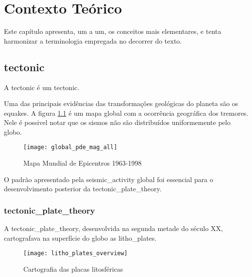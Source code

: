 \chapter{Contexto Teórico}
\label{cap:conceitos}

Este capítulo apresenta, um a um, os conceitos mais elementares, 
e tenta harmonizar a terminologia empregada no decorrer do texto.


\section{\Gls{tectonic}}
\label{sec:02_tectonica}

A \gls{tectonic} é um \glsdesc*{tectonic}.

Uma das principais evidências das transformações geológicas do planeta 
são os \glspl{equake}. A figura \ref{f:global_epicenters} \citep{img_world_epicenters}
é um mapa global com a ocorrência geográfica dos tremores. Nele é possivel notar que 
os sismos não são distribuídos uniformemente pelo globo.

\begin{figure}[!h]
   \centering
   \texttt{[image: global\_pde\_mag\_all]}
   \caption[Mapa Mundial de Epicentros 1963-1998]
   		   {Mapa Mundial de Epicentros 1963-1998\footnotemark} 
   \label{f:global_epicenters}
\end{figure} 
 
O padrão apresentado pela \gls{seismic_activity} global foi essencial 
para o desenvolvimento posterior da \gls*{tectonic_plate_theory}.

\subsection{\Gls{tectonic_plate_theory}}
\label{sec:02_placas}

A \gls*{tectonic_plate_theory}, desenvolvida na segunda metade do século XX,
cartografava na superfície do globo as \glspl{litho_plate}.


\begin{figure}[!h]
   \centering
   \texttt{[image: litho\_plates\_overview]}
   \caption[Cartografia das placas litosféricas]
   		   {Cartografia das placas litosféricas\footnotemark} 
   \label{f:plates_overview}
\end{figure} 
 

